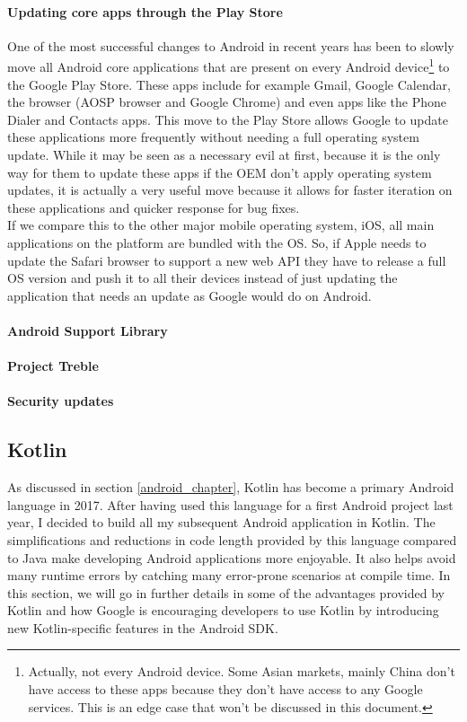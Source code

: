 \documentclass[11pt,a4paper]{report}
\begin{document}
\paragraph{Updating core apps through the Play Store}
One of the most successful changes to Android in recent years has been to slowly move all Android core applications that are present on every Android device\footnote{Actually, not every Android device. Some Asian markets, mainly China don't have access to these apps because they don't have access to any Google services. This is an edge case that won't be discussed in this document. } to the Google Play Store. These apps include for example Gmail, Google Calendar, the browser (AOSP browser and Google Chrome) and even apps like the Phone Dialer and Contacts apps. This move to the Play Store allows Google to update these applications more frequently without needing a full operating system update. While it may be seen as a necessary evil at first, because it is the only way for them to update these apps if the OEM don't apply operating system updates, it is actually a very useful move because it allows for faster iteration on these applications and quicker response for bug fixes.\\

If we compare this to the other major mobile operating system, iOS, all main applications on the platform are bundled with the OS. So, if Apple needs to update the Safari browser to support a new web API they have to release a full OS version and push it to all their devices instead of just updating the application that needs an update as Google would do on Android.
\paragraph{Android Support Library}
\paragraph{Project Treble}
\paragraph{Security updates}
\subsection{Kotlin}
\label{kotlin}
As discussed in section \ref{android_chapter}, Kotlin has become a primary Android language in 2017. After having used this language for a first Android project last year, I decided to build all my subsequent Android application in Kotlin. The simplifications and reductions in code length provided by this language compared to Java make developing Android applications more enjoyable. It also helps avoid many runtime errors by catching many error-prone scenarios at compile time. In this section, we will go in further details in some of the advantages provided by Kotlin and how Google is encouraging developers to use Kotlin by introducing new Kotlin-specific features in the Android SDK.
\end{document}
